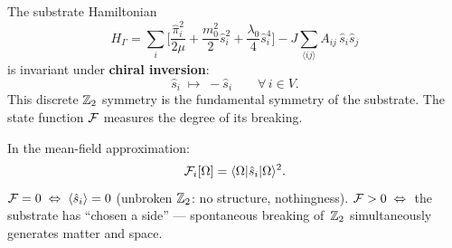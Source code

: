\begin{proposition}\label{prop:Z2}
The substrate Hamiltonian
\begin{equation}\label{eq:H-Gamma}
    H_\Gamma = \sum_i \biggl[
      \frac{\hat{\pi}_i^2}{2\mu}
    + \frac{m_0^2}{2}\hat{s}_i^2
    + \frac{\lambda_0}{4}\hat{s}_i^4
    \biggr]
    - J\!\sum_{\langle ij\rangle} A_{ij}\,\hat{s}_i\hat{s}_j
\end{equation}
is invariant under \textbf{chiral inversion}:
\begin{equation}\label{eq:Z2-chiral}
    \hat{s}_i \;\mapsto\; -\hat{s}_i
    \qquad \forall\, i \in V.
\end{equation}
This discrete $\mathbb{Z}_2$ symmetry is the fundamental symmetry of the
substrate.  The state function $\mathcal{F}$ measures the degree of its
breaking.
\end{proposition}

\begin{corollary}\label{cor:F-s}
In the mean-field approximation:
\begin{equation}\label{eq:F-s-relation}
    \mathcal{F}_i[\Omega]
    = \langle\Omega|\hat{s}_i|\Omega\rangle^2.
\end{equation}
$\mathcal{F} = 0 \;\Leftrightarrow\;
\langle\hat{s}_i\rangle = 0$
(unbroken $\mathbb{Z}_2$: no structure, nothingness).
$\mathcal{F} > 0 \;\Leftrightarrow\;$ the substrate has ``chosen a side''
--- spontaneous breaking of~$\mathbb{Z}_2$ simultaneously generates matter
and space.
\end{corollary}
